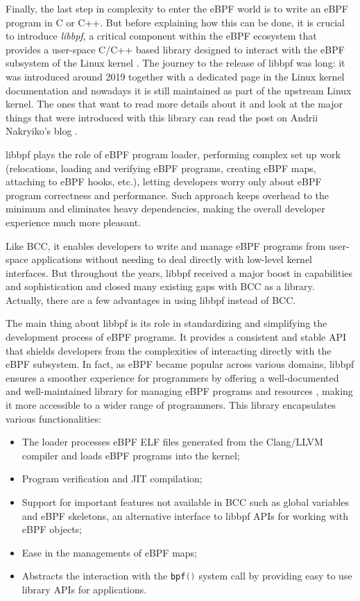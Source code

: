 Finally, the last step in complexity to enter the eBPF world is to write an eBPF program in C or C++.
But before explaining how this can be done, it is crucial to introduce \textit{libbpf},
a critical component within the eBPF ecosystem that provides a user-space C/C++ based library designed to interact with the eBPF subsystem of the Linux kernel \cite{libbpfGitHub}. 
The journey to the release of libbpf was long: it was introduced around 2019 together with a dedicated page in the Linux kernel documentation \cite{libbpfPageLinuxKernelDOc} and nowadays it is still maintained as part of the upstream Linux kernel.
The ones that want to read more details about it and look at the major things that were introduced with this library can read the post on Andrii Nakryiko's blog \cite{libbpfJourney}.

libbpf plays the role of eBPF program loader, performing complex set up work (relocations, loading and verifying eBPF programs, creating eBPF maps, attaching to eBPF hooks, etc.), letting developers worry only about eBPF program correctness and performance. 
Such approach keeps overhead to the minimum and eliminates heavy dependencies, making the overall developer experience much more pleasant.

Like BCC, it enables developers to write and manage eBPF programs from user-space applications without needing to deal directly with low-level kernel interfaces.
But throughout the years, libbpf received a major boost in capabilities and sophistication and closed many existing gaps with BCC as a library.
Actually, there are a few advantages in using libbpf instead of BCC.

The main thing about libbpf is its role in standardizing and simplifying the development process of eBPF programs. 
It provides a consistent and stable API that shields developers from the complexities of interacting directly with the eBPF subsystem. 
In fact, as eBPF became popular across various domains, libbpf ensures a smoother experience for programmers by offering a well-documented and well-maintained library for managing eBPF programs and resources \cite{libbpfDocumentation}, making it more accessible to a wider range of programmers.
This library encapsulates various functionalities:

\begin{itemize}
	\item 
		The loader processes eBPF ELF files generated from the Clang/LLVM compiler and loads eBPF programs into the kernel;
	\item 
		Program verification and JIT compilation;
	\item 
		Support for important features not available in BCC such as global variables and eBPF skeletons, an alternative interface to libbpf APIs for working with eBPF objects;
	\item 
		Ease in the managements of eBPF maps;
	\item 
		Abstracts the interaction with the \colorbox{backcolour}{\lstinline[style=cstyle, language=C]|bpf()|} system call by providing easy to use library APIs for applications.
\end{itemize}

